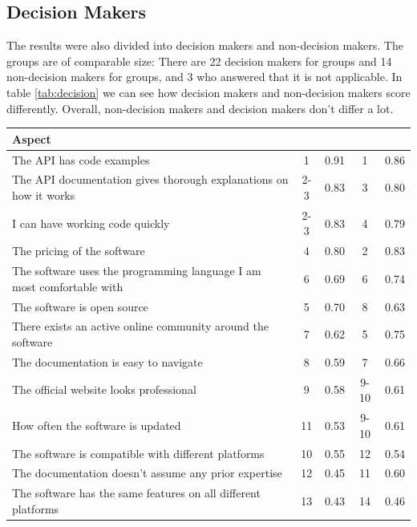 \documentclass{cslthse-msc}
\begin{document}
    \subsection{Decision Makers}
    The results were also divided into decision makers and non-decision makers. The
    groups are of comparable size: There are 22 decision makers for groups
    and 14 non-decision makers for groups, and 3 who answered that it is not
    applicable. In table \ref{tab:decision} we can see how decision makers and non-decision makers score differently.
    Overall, non-decision makers and decision makers don't differ a lot.
    \begin{table}[H]
        \centering
        \begin{tabularx}{\columnwidth}{X|c:c|c:c|}
            \textbf{Aspect}	&\textbf{}&\textbf{}&\textbf{}&\textbf{}	\\ \hline
            The API has code examples	&	1	&	0.91	&	1	&	0.86	\\ \hline
            The API documentation gives thorough explanations on how it works	&	2-3	&	0.83	&	3	&	0.80	\\ \hline
            I can have working code quickly	&	2-3	&	0.83	&	4	&	0.79	\\ \hline
            The pricing of the software	&	4	&	0.80	&	2	&	0.83	\\ \hline
            The software uses the programming language I am most comfortable with	&	6	&	0.69	&	6	&	0.74	\\ \hline
            The software is open source	&	5	&	0.70	&	8	&	0.63	\\ \hline
            There exists an active online community around the software	&	7	&	0.62	&	5	&	0.75	\\ \hline
            The documentation is easy to navigate	&	8	&	0.59	&	7	&	0.66	\\ \hline
            The official website looks professional	&	9	&	0.58	&	9-10	&	0.61	\\ \hline
            How often the software is updated	&	11	&	0.53	&	9-10	&	0.61	\\ \hline
            The software is compatible with different platforms	&	10	&	0.55	&	12	&	0.54	\\ \hline
            The documentation doesn't assume any prior expertise	&	12	&	0.45	&	11	&	0.60	\\ \hline
            The software has the same features on all different platforms	&	13	&	0.43	&	14	&	0.46	\\ \hline

\end{tabularx}
\end{table}
\end{document}
